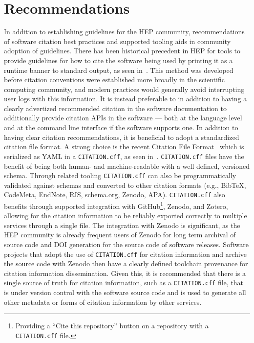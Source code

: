 \section{Recommendations}\label{sec:recommendations}
%

In addition to establishing guidelines for the HEP community, recommendations of software citation best practices and supported tooling aids in community adoption of guidelines.
There has been historical precedent in HEP for tools to provide guidelines for how to cite the software being used by printing it as a runtime banner to standard output, as seen in~.
This method was developed before citation conventions were established more broadly in the scientific computing community, and modern practices would generally avoid interrupting user logs with this information.
It is instead preferable to in addition to having a clearly advertized recommended citation in the software documentation to additionally provide citation APIs in the software --- both at the language level and at the command line interface if the software supports one.
In addition to having clear citation recommendations, it is beneficial to adopt a standardized citation file format.
A strong choice is the recent Citation File Format~\cite{Druskat_Citation_File_Format_2021} which is serialized as YAML in a \texttt{CITATION.cff}, as seen in~.
\texttt{CITATION.cff} files have the benefit of being both human- and machine-readable with a well defined, versioned schema.
Through related tooling \texttt{CITATION.cff} can also be programmatically validated against schemas and converted to other citation formats (e.g., BibTeX, CodeMeta, EndNote, RIS, schema.org, Zenodo, APA).
\texttt{CITATION.cff} also benefits through supported integration with GitHub\footnote{Providing a ``Cite this repository'' button on a repository with a \texttt{CITATION.cff} file.}, Zenodo, and Zotero, allowing for the citation information to be reliably exported correctly to multiple services through a single file.
The integration with Zenodo is significant, as the HEP community is already frequent users of Zenodo for long term archival of source code and DOI generation for the source code of software releases.
Software projects that adopt the use of \texttt{CITATION.cff} for citation information and archive the source code with Zenodo then have a clearly defined toolchain provenance for citation information dissemination.
Given this, it is recommended that there is a single source of truth for citation information, such as a \texttt{CITATION.cff} file, that is under version control with the software source code and is used to generate all other metadata or forms of citation information by other services.

